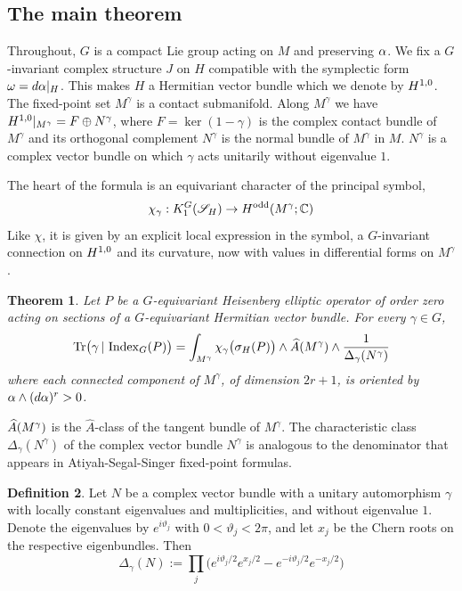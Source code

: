 \documentclass[11pt]{amsart}
\theoremstyle{plain}
\newtheorem{theorem}{Theorem}[section]
\theoremstyle{definition}
\newtheorem{definition}[theorem]{Definition}
\theoremstyle{remark}
\begin{document}
\subsection{The main theorem}
Throughout, $G$ is a compact Lie group acting on $M$ and preserving $\alpha$.
We fix a $G$-invariant complex structure $J$ on $H$ compatible with the symplectic form $\omega=d\alpha|_H$.
This  makes $H$ a Hermitian vector bundle which we denote by $H^{1,0}$.
The fixed-point set $M^\gamma$ is a contact submanifold.
Along $M^\gamma$ we have $H^{1,0}|_{M^\gamma}=F\oplus N^\gamma$, where $F=\ker(1-\gamma)$ is the complex contact bundle of $M^\gamma$ and its orthogonal complement $N^\gamma$ is the normal bundle of $M^\gamma$ in $M$.
$N^\gamma$ is a complex vector bundle on which $\gamma$ acts unitarily without eigenvalue $1$.

The heart of the formula is an equivariant  character of the principal symbol,
\[ \chi_\gamma:K_1^G({\mathscr{S}_H})\to H^{\mathrm{odd}}(M^\gamma;{\mathbb{C}})\]
Like $\chi$, it is given by an explicit local expression in the symbol, a $G$-invariant connection on $H^{1,0}$ and its curvature, now with values in differential forms on $M^\gamma$.

\begin{theorem}\label{thm:main-intro}
Let $P$ be a $G$-equivariant Heisenberg elliptic operator of order zero acting on sections of a
$G$-equivariant Hermitian vector bundle.
For every $\gamma\in G$,
\[
 \operatorname{Tr}\bigl(\gamma\,|\,\operatorname{Index}_G(P)\bigr)
   =\int_{M^\gamma}
      \chi_\gamma\bigl(\sigma_H(P)\bigr)
      \wedge \widehat{A}(M^\gamma)\wedge \frac{1}{\Delta_\gamma(N^\gamma)}
\]
where each connected component of $M^\gamma$, of dimension $2r+1$, is oriented by $\alpha\wedge(d\alpha)^r>0$.
\end{theorem}

$\widehat{A}(M^\gamma)$ is the $\widehat A$-class of the tangent bundle of $M^\gamma$.
The characteristic class $\Delta_\gamma(N^\gamma)$ of the complex vector bundle $N^\gamma$ is analogous to the denominator that appears in Atiyah-Segal-Singer fixed-point formulas.

\begin{definition}\label{def:Delta_gamma}
Let $N$ be  a complex vector bundle with a unitary automorphism $\gamma$ with locally constant eigenvalues and multiplicities, and without eigenvalue $1$.
Denote the eigenvalues by $e^{i\vartheta_j}$ with $0<\vartheta_j<2\pi$, and let $x_j$ be the   Chern roots on the respective eigenbundles. Then 
\begin{equation*}
 \Delta_\gamma(N)
 :=
 \prod_{j}
   \bigl(e^{i\vartheta_j/2}e^{x_j/2}-e^{-i\vartheta_j/2}e^{-x_j/2} \bigr)
\end{equation*}
\end{definition}
\end{document}
